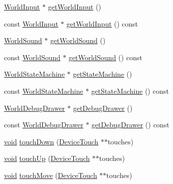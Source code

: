 \begin{DoxyCompactItemize}
\mbox{\hyperlink{classnjli_1_1_world_input}{World\+Input}} $\ast$ \mbox{\hyperlink{classnjli_1_1_world_a9b8a2755f4643d169d54e047554ba8f2}{get\+World\+Input}} ()
\item 
const \mbox{\hyperlink{classnjli_1_1_world_input}{World\+Input}} $\ast$ \mbox{\hyperlink{classnjli_1_1_world_aefbda7b9bf38ace818503473814d8b18}{get\+World\+Input}} () const
\item 
\mbox{\hyperlink{classnjli_1_1_world_sound}{World\+Sound}} $\ast$ \mbox{\hyperlink{classnjli_1_1_world_aeafce2408df830b6d0d4f4cc70a502f6}{get\+World\+Sound}} ()
\item 
const \mbox{\hyperlink{classnjli_1_1_world_sound}{World\+Sound}} $\ast$ \mbox{\hyperlink{classnjli_1_1_world_aa0df2fe274aae44a7c3f4df0bfc2b2c8}{get\+World\+Sound}} () const
\item 
\mbox{\hyperlink{classnjli_1_1_world_state_machine}{World\+State\+Machine}} $\ast$ \mbox{\hyperlink{classnjli_1_1_world_a779f9ee41d7e73e013654dcdb1d83cf9}{get\+State\+Machine}} ()
\item 
const \mbox{\hyperlink{classnjli_1_1_world_state_machine}{World\+State\+Machine}} $\ast$ \mbox{\hyperlink{classnjli_1_1_world_aa78f8be7d30ab1d38cea248c3017f0a7}{get\+State\+Machine}} () const
\item 
\mbox{\hyperlink{classnjli_1_1_world_debug_drawer}{World\+Debug\+Drawer}} $\ast$ \mbox{\hyperlink{classnjli_1_1_world_abd9b6751260b5e6c28fa9cfd874cfaad}{get\+Debug\+Drawer}} ()
\item 
const \mbox{\hyperlink{classnjli_1_1_world_debug_drawer}{World\+Debug\+Drawer}} $\ast$ \mbox{\hyperlink{classnjli_1_1_world_a88ce760cdc314298a58f96af3ef9d492}{get\+Debug\+Drawer}} () const
\item 
\mbox{\hyperlink{_thread_8h_af1e856da2e658414cb2456cb6f7ebc66}{void}} \mbox{\hyperlink{classnjli_1_1_world_a027fc2766ebe49b79f974e7e808610f8}{touch\+Down}} (\mbox{\hyperlink{classnjli_1_1_device_touch}{Device\+Touch}} $\ast$$\ast$touches)
\item 
\mbox{\hyperlink{_thread_8h_af1e856da2e658414cb2456cb6f7ebc66}{void}} \mbox{\hyperlink{classnjli_1_1_world_a1b2be462f5455b01856968eea7ee96bb}{touch\+Up}} (\mbox{\hyperlink{classnjli_1_1_device_touch}{Device\+Touch}} $\ast$$\ast$touches)
\item 
\mbox{\hyperlink{_thread_8h_af1e856da2e658414cb2456cb6f7ebc66}{void}} \mbox{\hyperlink{classnjli_1_1_world_a19b6222b4d9eaa0f83ab74f555ed6e68}{touch\+Move}} (\mbox{\hyperlink{classnjli_1_1_device_touch}{Device\+Touch}} $\ast$$\ast$touches)
\item 
$$
\end{DoxyCompactItemize}
